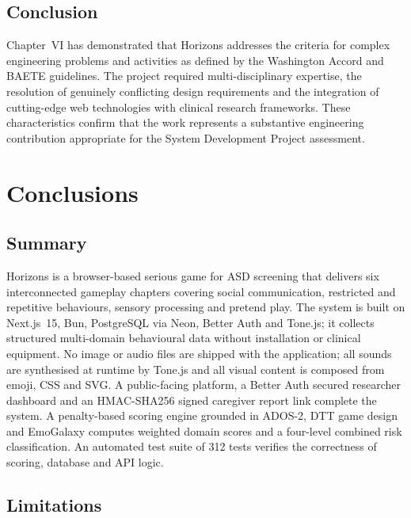 \documentclass[12pt,a4paper,oneside]{report}
\begin{document}
\section{Conclusion}

Chapter~VI has demonstrated that Horizons addresses the criteria for complex engineering problems and activities as defined by the Washington Accord and BAETE guidelines. The project required multi-disciplinary expertise, the resolution of genuinely conflicting design requirements and the integration of cutting-edge web technologies with clinical research frameworks. These characteristics confirm that the work represents a substantive engineering contribution appropriate for the System Development Project assessment.

\clearpage
\chapter{Conclusions}

\section{Summary}

Horizons is a browser-based serious game for ASD screening that delivers six interconnected gameplay chapters covering social communication, restricted and repetitive behaviours, sensory processing and pretend play. The system is built on Next.js~15, Bun, PostgreSQL via Neon, Better Auth and Tone.js; it collects structured multi-domain behavioural data without installation or clinical equipment. No image or audio files are shipped with the application; all sounds are synthesised at runtime by Tone.js and all visual content is composed from emoji, CSS and SVG. A public-facing platform, a Better Auth secured researcher dashboard and an HMAC-SHA256 signed caregiver report link complete the system. A penalty-based scoring engine grounded in ADOS-2, DTT game design and EmoGalaxy computes weighted domain scores and a four-level combined risk classification. An automated test suite of 312 tests verifies the correctness of scoring, database and API logic.

\section{Limitations}
\end{document}
